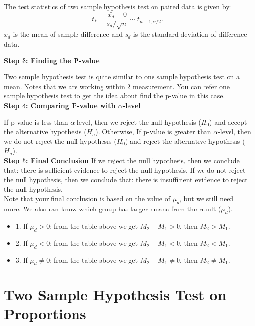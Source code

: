 \begin{definition}
The test statistics of two sample hypothesis test on paired data is given by: \[ t_* = \frac{\bar{x_d}-0}{s_d / \sqrt{n}} \sim t_{n-1;\alpha/2}.\]
$\bar{x_d}$ is the mean of sample difference and $s_d$ is the standard deviation of difference data.
\end{definition}

\textbf{Step 3: Finding the P-value}

Two sample hypothesis test is quite similar to one sample hypothesis test on a mean. Notes that we are working within 2 measurement. You can refer one sample hypothesis test to get the idea about find the p-value in this case.\\

\textbf{Step 4: Comparing P-value with $\alpha$-level}

If p-value is less than $\alpha$-level, then we reject the null hypothesis ($H_0$) and accept the alternative hypothesis ($H_a$). Otherwise, If p-value is greater than $\alpha$-level, then we do not reject the null hypothesis ($H_0$) and reject the alternative hypothesis ($H_a$).\\

\textbf{Step 5: Final Conclusion}
If we reject the null hypothesis, then we conclude that: there is sufficient evidence to reject the null hypothesis. If we do not reject the null hypothesis, then we conclude that: there is insufficient evidence to reject the null hypothesis.\\

Note that your final conclusion is based on the value of $\mu_d$, but we still need more. We also can know which group has larger means from the result ($\mu_d$).

\begin{itemize}
	\item 1. If $\mu_d > 0$: from the table above we get $M_2-M_1 >0$, then $M_2 > M_1$.
	\item 2. If $\mu_d < 0$: from the table above we get $M_2-M_1 <0$, then $M_2 < M_1$.
	\item 3. If $\mu_d \neq 0$: from the table above we get $M_2-M_1 \neq 0$, then $M_2 \neq M_1$.
\end{itemize}

\section{Two Sample Hypothesis Test on Proportions}

